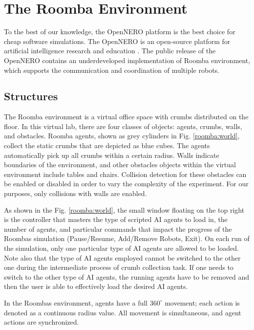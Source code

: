 \documentclass[conference]{IEEEtran}
\begin{document}
\section{The Roomba Environment} \label{section:environment}
To the best of our knowledge, the OpenNERO platform is the best choice for
cheap software simulations. 
The OpenNERO is an open-source platform for artificial intelligence
research and education \cite{karpov2008opennero}. 
The public release of the OpenNERO contains an underdeveloped implementation
of Roomba environment, which supports the communication and coordination of
multiple robots.

\subsection{Structures}
The Roomba environment is a virtual office space with crumbs distributed on
the floor.
In this virtual lab, there are four classes of objects: agents, crumbs, walls,
and obstacles. 
Roomba agents, shown as grey cylinders in Fig. \ref{roomba:world}, collect the static crumbs that are depicted as blue cubes.  The
agents automatically pick up all crumbs within a certain radius. 
Walls indicate boundaries of the environment, and other obstacles objects within the virtual environment include tables and chairs. Collision detection for these obstacles can be enabled or disabled in order to vary the complexity of the experiment. For our purposes, only collisions with walls are enabled.

As shown in the Fig. \ref{roomba:world}, the small window floating on the top right
is the controller that masters the type of scripted AI agents to load in, the
number of agents, and particular commands that impact the progress of the
Roombas simulation (Pause/Resume, Add/Remove Robots, Exit). On each run of the
simulation, only one particular type of AI agents are allowed to be loaded.
Note also that the type of AI agents employed cannot be switched to the other
one during the intermediate process of crumb collection task. 
If one needs to switch to the other type of AI agents, the running agents have
to be removed and then the user is able to effectively load the desired AI agents.


In the Roombas environment, agents have a full $360^\circ$ movement; each action is
denoted as a continuous radius value. All movement is simultaneous, and agent actions are synchronized. 
\end{document}
